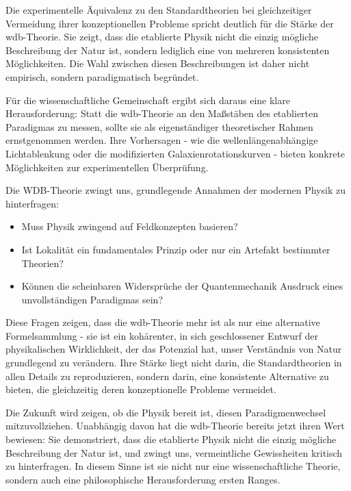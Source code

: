 \documentclass[11pt, a4paper, twoside, openright]{book}
\begin{document}
Die experimentelle Äquivalenz zu den Standardtheorien bei gleichzeitiger Vermeidung ihrer konzeptionellen Probleme spricht deutlich für die Stärke der \gls{wdb}-Theorie. Sie zeigt,
dass die etablierte Physik nicht die einzig mögliche Beschreibung der Natur ist, sondern lediglich eine von mehreren konsistenten Möglichkeiten. Die Wahl zwischen diesen Beschreibungen
ist daher nicht empirisch, sondern paradigmatisch begründet.

Für die wissenschaftliche Gemeinschaft ergibt sich daraus eine klare Herausforderung: Statt die \gls{wdb}-Theorie an den Maßstäben des etablierten Paradigmas zu messen, sollte sie als
eigenständiger theoretischer Rahmen ernstgenommen werden. Ihre Vorhersagen - wie die wellenlängenabhängige Lichtablenkung oder die modifizierten Galaxienrotationskurven - bieten konkrete
Möglichkeiten zur experimentellen Überprüfung.

Die WDB-Theorie zwingt uns, grundlegende Annahmen der modernen Physik zu hinterfragen:
\begin{itemize}
    \item Muss Physik zwingend auf Feldkonzepten basieren?
    \item Ist Lokalität ein fundamentales Prinzip oder nur ein Artefakt bestimmter Theorien?
    \item Können die scheinbaren Widersprüche der Quantenmechanik Ausdruck eines unvollständigen Paradigmas sein?
\end{itemize}
Diese Fragen zeigen, dass die \gls{wdb}-Theorie mehr ist als nur eine alternative Formelsammlung - sie ist ein kohärenter, in sich geschlossener Entwurf der physikalischen Wirklichkeit,
der das Potenzial hat, unser Verständnis von Natur grundlegend zu verändern. Ihre Stärke liegt nicht darin, die Standardtheorien in allen Details zu reproduzieren, sondern darin, eine
konsistente Alternative zu bieten, die gleichzeitig deren konzeptionelle Probleme vermeidet.

Die Zukunft wird zeigen, ob die Physik bereit ist, diesen Paradigmenwechsel mitzuvollziehen. Unabhängig davon hat die \gls{wdb}-Theorie bereits jetzt ihren Wert bewiesen: Sie demonstriert,
dass die etablierte Physik nicht die einzig mögliche Beschreibung der Natur ist, und zwingt uns, vermeintliche Gewissheiten kritisch zu hinterfragen. In diesem Sinne ist sie nicht nur eine
wissenschaftliche Theorie, sondern auch eine philosophische Herausforderung ersten Ranges.

\tableofcontents

\mainmatter






\backmatter
\printbibliography[title=Literaturverzeichnis]
\printglossary[title=Glossar]
\printglossary[type=acronym, title=Abkürzungen]
\end{document}
